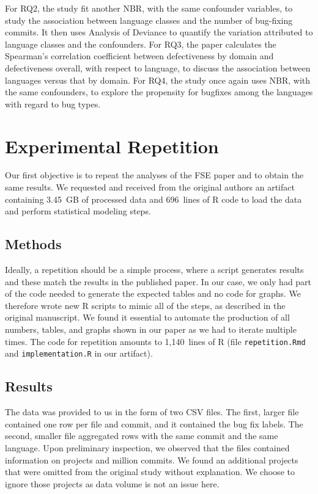 \documentclass[acmsmall]{acmart}
\newcommand{\code}[1]{{\tt\small #1}\xspace}
\begin{document}
For RQ2, the study fit another NBR, with the same confounder variables, to
study the association between language classes and the number of bug-fixing
commits.  It then uses Analysis of Deviance to quantify the variation
attributed to language classes and the confounders. For RQ3, the paper
calculates the Spearman's correlation coefficient between defectiveness by
domain and defectiveness overall, with respect to language, to discuss the
association between languages versus that by domain. For RQ4, the study once
again uses NBR, with the same confounders, to explore the propensity for
bugfixes among the languages with regard to bug types. 

\section{Experimental Repetition}

Our first objective is to repeat the analyses of the FSE paper and to
obtain the same results. We requested and received from the original authors
an artifact containing 3.45~GB of processed data and 696~lines of R code to
load the data and perform statistical modeling steps.

\subsection{Methods}

Ideally, a repetition should be a simple process, where a script generates
results and these match the results in the published paper. In our case, we
only had part of the code needed to generate the expected tables and no code
for graphs.  We therefore wrote new R scripts to mimic all of the steps, as
described in the original manuscript.  We found it essential to automate the
production of all numbers, tables, and graphs shown in our paper as we had
to iterate multiple times. The code for repetition amounts to 1,140~lines of
R (file \code{\small repetition.Rmd} and \code{\small implementation.R} in
our artifact).

\subsection{Results}

The data was provided to us in the form of two CSV files. The first, larger
file contained one row per file and commit, and it contained the bug fix
labels.  The second, smaller file aggregated rows with the same commit and
the same language. Upon preliminary inspection, we observed that the files
contained information on \numberOfProjectsIncluded projects and
\numberCommitsMio million commits.  We found an additional
\numberOfProjectsNotIncluded projects that were omitted from the original
study without explanation.  We choose to ignore those projects as data
volume is not an issue here.
\end{document}
